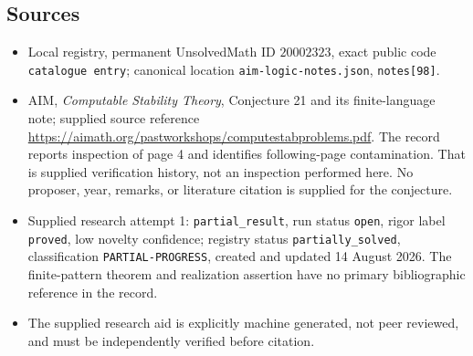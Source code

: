 \documentclass[11pt]{article}
\begin{document}
\subsection{Sources}
\begin{itemize}
\item Local registry, permanent UnsolvedMath ID \(20002323\), exact public code \texttt{catalogue entry}; canonical location \texttt{aim-logic-notes.json}, \texttt{notes[98]}.
\item AIM, \emph{Computable Stability Theory}, Conjecture 21 and its finite-language note; supplied source reference \url{https://aimath.org/pastworkshops/computestabproblems.pdf}. The record reports inspection of page 4 and identifies following-page contamination. That is supplied verification history, not an inspection performed here. No proposer, year, remarks, or literature citation is supplied for the conjecture.
\item Supplied research attempt 1: \texttt{partial\_result}, run status \texttt{open}, rigor label \texttt{proved}, low novelty confidence; registry status \texttt{partially\_solved}, classification \texttt{PARTIAL-PROGRESS}, created and updated 14 August 2026. The finite-pattern theorem and realization assertion have no primary bibliographic reference in the record.
\item The supplied research aid is explicitly machine generated, not peer reviewed, and must be independently verified before citation.
\end{itemize}
\end{document}
